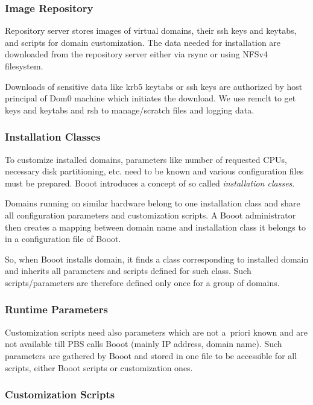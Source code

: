 \documentclass[a4paper]{article}
\begin{document}
\subsubsection{Image Repository}

Repository server stores images of virtual domains, their ssh keys and
keytabs, and scripts for domain customization. The data needed for
installation are downloaded from the repository server either via rsync or
using NFSv4 filesystem.

Downloads of sensitive data like krb5 keytabs or ssh keys are authorized by
host principal of Dom0 machine which initiates the download. We use remclt
to get keys and keytabs and rsh to manage/scratch files and logging data.

\subsubsection{Installation Classes}
\label{ic}

To customize installed domains, parameters like number of requested CPUs,
necessary disk partitioning, etc. need to be known and various
configuration files must be prepared. Booot introduces a concept of so
called \emph{installation classes}.

Domains running on similar hardware belong to one installation class and
share all configuration parameters and  customization scripts. A Booot
administrator then creates a mapping between domain name and installation
class it belongs to in a configuration file of Booot.

So, when Booot installs domain, it finds a class corresponding to installed domain and inherits all parameters and scripts defined for such class. Such scripts/parameters are therefore defined only once for a group of domains.

\subsubsection{Runtime Parameters}
\label{rp}

Customization scripts need also parameters which are not a~priori known
and are not available till PBS calls Booot (mainly IP address, domain
name). Such parameters are gathered by Booot and stored in one file to be
accessible for all scripts, either Booot scripts or customization ones.

\subsubsection{Customization Scripts}
\end{document}
